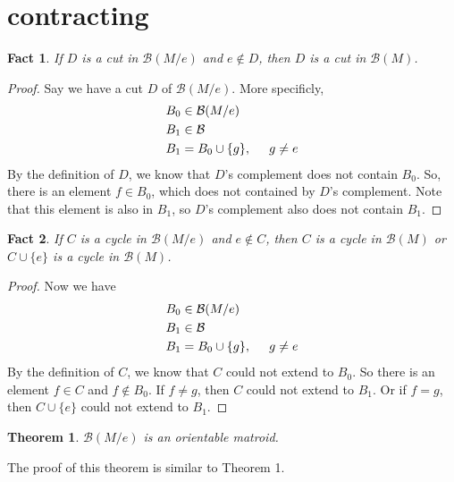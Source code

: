 \documentclass{article}
\newtheorem{fact}{Fact}
\newtheorem{theorem}{Theorem}
\begin{document}
\section{contracting}
\begin{fact}
  If $D$ is a cut in $\mathcal{B}(M/e)$ and $e\not\in D$,
  then $D$ is a cut in $\mathcal{B}(M)$.
\end{fact}
\begin{proof}
  Say we have a cut $D$ of $\mathcal{B}(M/e)$.
  More specificly,
  \begin{align*}
    B_0 &\in \mathcal{B}(M/e) \\
    B_1 &\in \mathcal{B} \\
    B_1 &= B_0 \cup \{g\}, \hspace{0.5cm} g\not= e
  \end{align*}
  By the definition of $D$, we know that $D$'s complement does not contain $B_0$.
  So, there is an element $f\in B_0$, which does not contained by $D$'s complement.
  Note that this element is also in $B_1$, so $D$'s complement also does not contain $B_1$.
\end{proof}

\begin{fact}
  If $C$ is a cycle in $\mathcal{B}(M/e)$ and $e\not\in C$, then $C$ is a cycle in $\mathcal{B}(M)$ or $C\cup \{e\}$ is a cycle in $\mathcal{B}(M)$.
\end{fact}
\begin{proof}
  Now we have
  \begin{align*}
    B_0 &\in \mathcal{B}(M/e) \\
    B_1 &\in \mathcal{B} \\
    B_1 &= B_0 \cup \{g\}, \hspace{0.5cm} g\not= e
  \end{align*}
  By the definition of $C$, we know that $C$ could not extend to $B_0$.
  So there is an element $f\in C$ and $f\not\in B_0$.
  If $f\not= g$, then $C$ could not extend to $B_1$.
  Or if $f = g$, then $C\cup\{e\}$ could not extend to $B_1$.
\end{proof}

\begin{theorem}
  $\mathcal{B}(M/e)$ is an orientable matroid.
\end{theorem}
The proof of this theorem is similar to Theorem 1.
\end{document}
